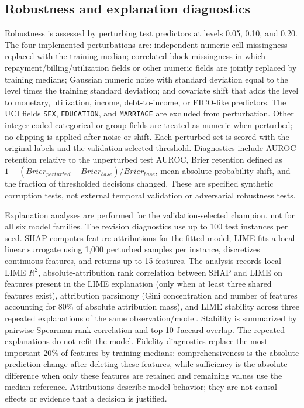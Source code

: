 \documentclass[pdflatex,sn-mathphys-num]{sn-jnl}
\begin{document}
\subsection{Robustness and explanation diagnostics}
Robustness is assessed by perturbing test predictors at levels 0.05, 0.10, and 0.20. The four implemented perturbations are: independent numeric-cell missingness replaced with the training median; correlated block missingness in which repayment/billing/utilization fields or other numeric fields are jointly replaced by training medians; Gaussian numeric noise with standard deviation equal to the level times the training standard deviation; and covariate shift that adds the level to monetary, utilization, income, debt-to-income, or FICO-like predictors. The UCI fields \texttt{SEX}, \texttt{EDUCATION}, and \texttt{MARRIAGE} are excluded from perturbation. Other integer-coded categorical or group fields are treated as numeric when perturbed; no clipping is applied after noise or shift. Each perturbed set is scored with the original labels and the validation-selected threshold. Diagnostics include AUROC retention relative to the unperturbed test AUROC, Brier retention defined as $1-(Brier_{perturbed}-Brier_{base})/Brier_{base}$, mean absolute probability shift, and the fraction of thresholded decisions changed. These are specified synthetic corruption tests, not external temporal validation or adversarial robustness tests.

Explanation analyses are performed for the validation-selected champion, not for all six model families. The revision diagnostics use up to 100 test instances per seed. SHAP computes feature attributions for the fitted model; LIME fits a local linear surrogate using 1,000 perturbed samples per instance, discretizes continuous features, and returns up to 15 features. The analysis records local LIME $R^2$, absolute-attribution rank correlation between SHAP and LIME on features present in the LIME explanation (only when at least three shared features exist), attribution parsimony (Gini concentration and number of features accounting for 80\% of absolute attribution mass), and LIME stability across three repeated explanations of the same observation/model. Stability is summarized by pairwise Spearman rank correlation and top-10 Jaccard overlap. The repeated explanations do not refit the model. Fidelity diagnostics replace the most important 20\% of features by training medians: comprehensiveness is the absolute prediction change after deleting these features, while sufficiency is the absolute difference when only these features are retained and remaining values use the median reference. Attributions describe model behavior; they are not causal effects or evidence that a decision is justified.
\end{document}
